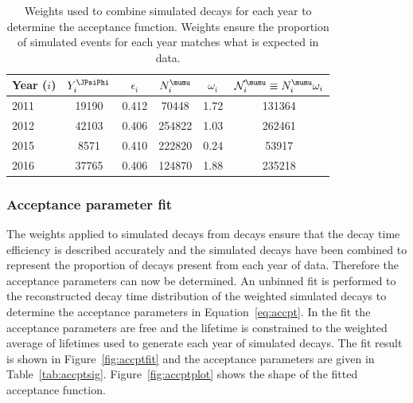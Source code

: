 \begin{table}[tb]
\begin{center}
\begin{tabular}{lccccc}
\toprule \toprule
Year ($i$) & $Y_i^{\JPsiPhi}$ & $\epsilon_i$ & $N^{\mumu}_i$ & $\omega_i$ & $\mathcal{N}^{\mumu}_i \equiv N^{\mumu}_i \omega_i$ \\ \midrule 
2011       & 19190           & 0.412        & 70448        & 1.72       & 131364 \\
2012       & 42103           & 0.406        & 254822       & 1.03       & 262461 \\
2015       & 8571            & 0.410        & 222820       & 0.24       & 53917 \\ 
2016       & 37765           & 0.406        & 124870       & 1.88       & 235218 \\ \bottomrule \bottomrule
\end{tabular}
\vspace{0.7cm}                                                                                                                                               
\caption{Weights used to combine simulated \bsmumu decays for each year to determine the acceptance function. Weights ensure the proportion of simulated events for each year matches what is expected in data.}
\label{tab:MCWeightInfo}
\end{center}
\vspace{-1.0cm}                                                                                                                                               
\end{table}


\subsubsection*{Acceptance parameter fit}

The weights applied to \bsmumu simulated decays from \bdkpi decays ensure that the decay time efficiency is described accurately and the simulated decays have been combined to represent the proportion of decays present from each year of data. Therefore the acceptance parameters can now be determined.  
An unbinned \ml fit is performed to the reconstructed decay time distribution of the weighted simulated \bsmumu decays to determine the acceptance parameters in Equation~\ref{eq:accpt}. In the fit the acceptance parameters are free and the \bsmumu lifetime is constrained to the weighted average of lifetimes used to generate each year of simulated decays. The fit result is shown in Figure~\ref{fig:accptfit} and the acceptance parameters are given in Table~\ref{tab:accptsig}. Figure~\ref{fig:accptplot} shows the shape of the fitted acceptance function. %

